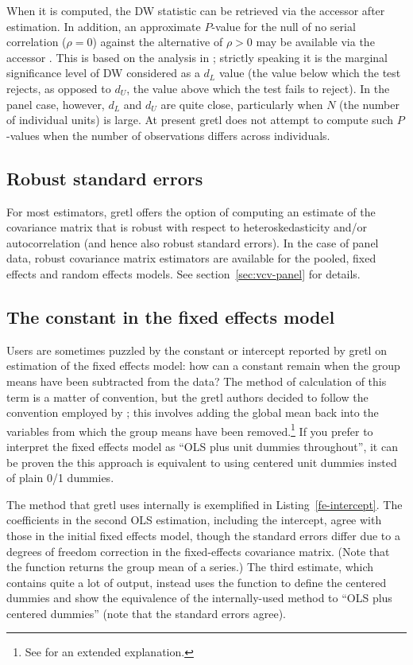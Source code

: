 When it is computed, the DW statistic can be retrieved via the
accessor  after estimation. In addition, an approximate
$P$-value for the null of no serial correlation ($\rho = 0$) against
the alternative of $\rho > 0$ may be available via the accessor
. This is based on the analysis in \cite{BFN82};
strictly speaking it is the marginal significance level of DW
considered as a $d_L$ value (the value below which the test rejects,
as opposed to $d_U$, the value above which the test fails to reject).
In the panel case, however, $d_L$ and $d_U$ are quite close,
particularly when $N$ (the number of individual units) is large. At
present gretl does not attempt to compute such $P$-values when the
number of observations differs across individuals.

\subsection{Robust standard errors}
\label{panel-robust}

For most estimators, gretl offers the option of computing an estimate
of the covariance matrix that is robust with respect to
heteroskedasticity and/or autocorrelation (and hence also robust
standard errors).  In the case of panel data, robust covariance matrix
estimators are available for the pooled, fixed effects and random
effects models.  See section~\ref{sec:vcv-panel} for details.

\subsection{The constant in the fixed effects model}

Users are sometimes puzzled by the constant or intercept reported by
gretl on estimation of the fixed effects model: how can a constant
remain when the group means have been subtracted from the data? The
method of calculation of this term is a matter of convention, but the
gretl authors decided to follow the convention employed by
; this involves adding the global mean back into the
variables from which the group means have been removed.\footnote{See
  \cite{gould13} for an extended explanation.} If you prefer to
interpret the fixed effects model as ``OLS plus unit dummies
throughout'', it can be proven the this approach is equivalent to
using centered unit dummies insted of plain 0/1 dummies.

The method that gretl uses internally is exemplified in
Listing~\ref{fe-intercept}. The coefficients in the second OLS
estimation, including the intercept, agree with those in the initial
fixed effects model, though the standard errors differ due to a
degrees of freedom correction in the fixed-effects covariance matrix.
(Note that the  function returns the group mean of a
series.) The third estimate, which contains quite a lot of output,
instead uses the  function to define the centered dummies
and show the equivalence of the internally-used method to ``OLS plus
centered dummies'' (note that the standard errors agree).

